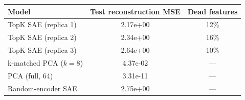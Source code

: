 \begin{tabular}{lcc}
\toprule
Model & Test reconstruction MSE & Dead features \\
\midrule
TopK SAE (replica 1) & 2.17e+00 & 12\% \\
TopK SAE (replica 2) & 2.34e+00 & 16\% \\
TopK SAE (replica 3) & 2.64e+00 & 10\% \\
k-matched PCA ($k=8$) & 4.37e-02 & --- \\
PCA (full, 64) & 3.31e-11 & --- \\
Random-encoder SAE & 2.75e+00 & --- \\
\bottomrule
\end{tabular}
